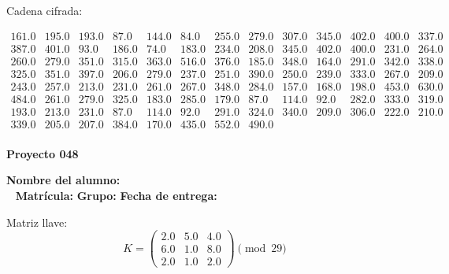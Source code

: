 \documentclass[12pt]{article}
\begin{document}
Cadena cifrada:
\begin{center}
$\begin{array}{lllllllllllll}
161.0 & 195.0 & 193.0 & 87.0 & 144.0 & 84.0 & 255.0 & 279.0 & 307.0 & 345.0 & 402.0 & 400.0 & 337.0\\
387.0 & 401.0 & 93.0 & 186.0 & 74.0 & 183.0 & 234.0 & 208.0 & 345.0 & 402.0 & 400.0 & 231.0 & 264.0\\
260.0 & 279.0 & 351.0 & 315.0 & 363.0 & 516.0 & 376.0 & 185.0 & 348.0 & 164.0 & 291.0 & 342.0 & 338.0\\
325.0 & 351.0 & 397.0 & 206.0 & 279.0 & 237.0 & 251.0 & 390.0 & 250.0 & 239.0 & 333.0 & 267.0 & 209.0\\
243.0 & 257.0 & 213.0 & 231.0 & 261.0 & 267.0 & 348.0 & 284.0 & 157.0 & 168.0 & 198.0 & 453.0 & 630.0\\
484.0 & 261.0 & 279.0 & 325.0 & 183.0 & 285.0 & 179.0 & 87.0 & 114.0 & 92.0 & 282.0 & 333.0 & 319.0\\
193.0 & 213.0 & 231.0 & 87.0 & 114.0 & 92.0 & 291.0 & 324.0 & 340.0 & 209.0 & 306.0 & 222.0 & 210.0\\
339.0 & 205.0 & 207.0 & 384.0 & 170.0 & 435.0 & 552.0 & 490.0\\
\end{array}$
\end{center}

\newpage


\textbf{Proyecto 048}

\textbf{Nombre del alumno:} \underline{\hspace{13cm}}\\\
\vspace{1cm}
\textbf{Matrícula:} \underline{\hspace{4cm}} \hspace{1cm}
\textbf{Grupo:} \underline{\hspace{2cm}}
\textbf{Fecha de entrega:} \underline{\hspace{2cm}}

\medskip

Matriz llave:
\[
K = \begin{pmatrix}
2.0 & 5.0 & 4.0\\
6.0 & 1.0 & 8.0\\
2.0 & 1.0 & 2.0
\end{pmatrix} \pmod{29}
\]
\end{document}
